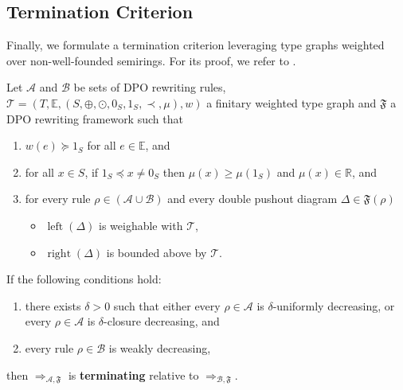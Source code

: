 \subsection{Termination Criterion}
\label{sec:proving_termination}
Finally, we formulate a termination criterion leveraging type graphs weighted over non-well-founded semirings. For its proof, we refer to \cite[Theorem 37]{qiu2025termination_nwf_v2_acceptedgcm}.
\begin{theorem} 
    \label{thm:termination_grs}
    Let $\mathcal{A}$ and $\mathcal{B}$ be sets of DPO rewriting rules, $\mathcal{T} = (T,\mathbb{E}, (S, \oplus, \odot, 0_S, 1_S, \prec, \mu), w)$ a finitary weighted type graph and $\mathfrak{F}$ a DPO rewriting framework such that

     \begin{enumerate}[label=\roman*)]
        \item\label{thm1:hyp3} $w(e) \succeq 1_S$ for all $e \in \mathbb{E}$, and
        \item\label{thm1:hyp4} for all $x \in S$, if $ 1_S \preceq x \neq 0_S$ then $\mu(x) \geq \mu(1_S)$ and $\mu(x) \in \mathbb{R}$, and
        \item for every rule $\rho \in (\mathcal{A }\cup \mathcal{B })$ and every double pushout diagram  
        $\Delta \in \mathfrak{F}(\rho)$ 
        \begin{itemize}
            \item \(\operatorname{left}(\Delta)\) is weighable with \(\mathcal{T}\),
            \item \(\operatorname{right}(\Delta)\) is bounded above by \(\mathcal{T}\). 
        \end{itemize}
    \end{enumerate}       

    \noindent If the following conditions hold:
    \begin{enumerate}
        \item there exists $\delta >0$ such that either every $\rho \in \mathcal{A}$ is $\delta$-uniformly decreasing, or every $\rho \in \mathcal{A}$ is $\delta$-closure decreasing, and
        \item every rule $\rho \in \mathcal{B}$ is weakly decreasing,
    \end{enumerate}
    then $\Rightarrow_{\mathcal{A},\mathfrak{F}}$ is \textbf{terminating} relative to $\Rightarrow_{\mathcal{B},\mathfrak{F}}$.
\end{theorem} 

